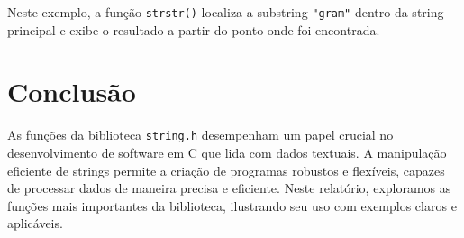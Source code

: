 \documentclass[12pt]{article}
\begin{document}
Neste exemplo, a função \texttt{strstr()} localiza a substring \texttt{"gram"} dentro da string principal e exibe o resultado a partir do ponto onde foi encontrada.

\section{Conclusão}
As funções da biblioteca \texttt{string.h} desempenham um papel crucial no desenvolvimento de software em C que lida com dados textuais. A manipulação eficiente de strings permite a criação de programas robustos e flexíveis, capazes de processar dados de maneira precisa e eficiente. Neste relatório, exploramos as funções mais importantes da biblioteca, ilustrando seu uso com exemplos claros e aplicáveis.
\end{document}
